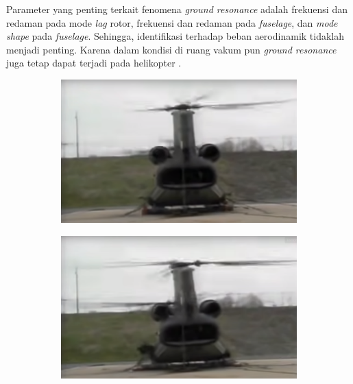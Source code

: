 Parameter yang penting terkait fenomena \textit{ground resonance} adalah frekuensi dan redaman pada mode \textit{lag} rotor, frekuensi dan redaman pada \textit{fuselage}, dan \textit{mode shape} pada \textit{fuselage}. Sehingga, identifikasi terhadap beban aerodinamik tidaklah menjadi penting. Karena dalam kondisi di ruang vakum pun \textit{ground resonance} juga tetap dapat terjadi pada helikopter \cite{bramwell2001bramwell}.

\begin{figure}[H]
	\centering
	\begin{subfigure}{0.4\textwidth}
		\centering
		\includegraphics[width=\linewidth]{gambar/gr_1.png}
		\caption{}
		\label{fig:gr_1}
	\end{subfigure}
	\centering
	\begin{subfigure}{0.4\textwidth}
		\centering
		\includegraphics[width=\linewidth]{gambar/gr_2.png}
		\caption{}
		\label{fig:gr_2}
	\end{subfigure}
\\
	\centering

\end{figure}
